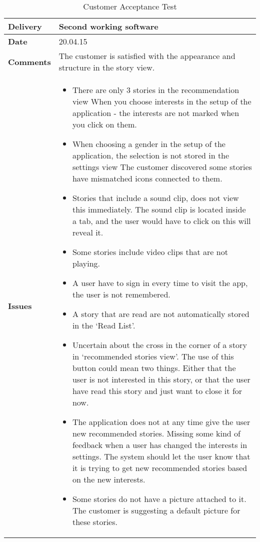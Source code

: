 			\renewcommand{\arraystretch}{2}%
			\begin{center}
				\begin{longtable}{ | p{4cm} | p{13cm} | }
					
					\caption[Customer Acceptance test]{Customer Acceptance Test } \label{Tab:cattest4}\\
					\hline
					\textbf{Delivery} & Second working software\\ \hline
					\textbf{Date} & 20.04.15\\ \hline
					\textbf{Comments} & The customer is satisfied with the appearance and structure in the story view. 
					\\ \hline
					\textbf{Issues} & 
					\begin{itemize}[noitemsep]
						
						\item There are only 3 stories in the recommendation view 
						When you choose interests in the setup of the application - the interests are not marked when you click on them. \newline
						\item When choosing a gender in the setup of the application, the selection is not stored in the settings view
						The customer discovered some stories have mismatched icons connected to them. \newline
						\item Stories that include a sound clip, does not view this immediately. The sound clip is located inside a tab, and the user would have to click on this will reveal it. \newline
						\item  Some stories include video clips that are not playing.  \newline
						\item  A user have to sign in every time to visit the app, the user is not remembered. \newline
						\item  A story that are read are not automatically stored in the ‘Read List’. \newline
						\item  Uncertain about the cross in the corner of a story in ‘recommended stories view’. The use of this button could mean two things. Either that the user is not interested in this story, or that the user have read this story and just want to close it for now. \newline
						\item  The application does not at any time give the user new recommended stories. \newline
						Missing some kind of feedback when a user has changed the interests in settings. The system should let the user know that it is trying to get new recommended stories based on the new interests. \newline
						\item Some stories do not have a picture attached to it. The customer is suggesting a default picture for these stories.
					\end{itemize}
					\\ \hline 
					

\end{longtable}
\end{center}
